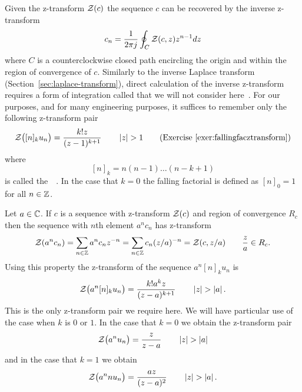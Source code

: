 \newcommand{\stirling}[2]{\genfrac{[}{]}{0pt}{}{#1}{#2}}
\newcommand{\eulerian}[2]{\genfrac{\langle}{\rangle}{0pt}{}{#1}{#2}}

Given the z-transform ${\mathcal Z}(c)$ the sequence $c$ can be recovered by the inverse z-transform
\[
c_n = \frac{1}{2\pi j} \oint_C {\mathcal Z}(c,z) z^{n-1} dz
\]
where $C$ is a counterclockwise closed path encircling the origin and within the region of convergence of $c$.  Similarly to the inverse Laplace transform (Section~\ref{sec:laplace-transform}), direct calculation of the inverse z-transform requires a form of integration called  that we will not consider here~\citep{Stewart_ComplexAnalysis_2004}.  For our purposes, and for many engineering purposes, it suffices to remember only the following z-transform pair 
\[
{\mathcal Z}\big( [n]_k u_n \big) = \frac{k! z }{(z - 1)^{k+1}} \qquad \left\vert z \right\vert > 1 \qquad \text{(Exercise~\ref{exer:fallingfacztransform})}
\]
where
\[
[n]_k = n (n-1) \dots (n-k+1)
\]
is called the~~\cite[p. 48]{concretemath_1994}.  In the case that $k=0$ the falling factorial is defined as $[n]_0 = 1$ for all $n\in{\mathbb Z}$.  

Let $a \in {\mathbb C}$.  If $c$ is a sequence with z-transform ${\mathcal Z}(c)$ and region of convergence $R_c$ then the sequence with $n$th element $a^nc_n$ has z-transform 
\[
{\mathcal Z}(a^n c_n) = \sum_{n \in {\mathbb Z}} a^n c_n z^{-n} = \sum_{n \in {\mathbb Z}} c_n (z/a)^{-n} = {\mathcal Z}(c, z/a) \qquad \frac{z}{a} \in R_c.
\]
Using this property the z-transform of the sequence $a^n [n]_k u_n$ is
\begin{equation}\label{eeq:onlyztrans}
{\mathcal Z}\big( a^n [n]_k u_n \big) = \frac{k! a^k z }{(z - a)^{k+1}} \qquad \left\vert z \right\vert > \left\vert a \right\vert.
\end{equation}
This is the only z-transform pair we require here.  We will have particular use of the case when $k$ is $0$ or $1$.  In the case that $k=0$ we obtain the z-transform pair
\[
{\mathcal Z}\big( a^n u_n \big) = \frac{ z }{z - a} \qquad \left\vert z \right\vert > \left\vert a \right\vert
\]
and in the case that $k=1$ we obtain
\[
{\mathcal Z}\big( a^n n u_n \big) = \frac{ a z }{(z - a)^{2}} \qquad \left\vert z \right\vert > \left\vert a \right\vert.
\]


